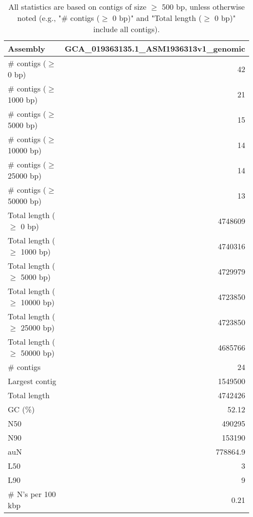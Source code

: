 \documentclass[12pt,a4paper]{article}
\begin{document}
\begin{table}[ht]
\begin{center}
\caption{All statistics are based on contigs of size $\geq$ 500 bp, unless otherwise noted (e.g., "\# contigs ($\geq$ 0 bp)" and "Total length ($\geq$ 0 bp)" include all contigs).}
\begin{tabular}{|l*{1}{|r}|}
\hline
Assembly & GCA\_019363135.1\_ASM1936313v1\_genomic \\ \hline
\# contigs ($\geq$ 0 bp) & 42 \\ \hline
\# contigs ($\geq$ 1000 bp) & 21 \\ \hline
\# contigs ($\geq$ 5000 bp) & 15 \\ \hline
\# contigs ($\geq$ 10000 bp) & 14 \\ \hline
\# contigs ($\geq$ 25000 bp) & 14 \\ \hline
\# contigs ($\geq$ 50000 bp) & 13 \\ \hline
Total length ($\geq$ 0 bp) & 4748609 \\ \hline
Total length ($\geq$ 1000 bp) & 4740316 \\ \hline
Total length ($\geq$ 5000 bp) & 4729979 \\ \hline
Total length ($\geq$ 10000 bp) & 4723850 \\ \hline
Total length ($\geq$ 25000 bp) & 4723850 \\ \hline
Total length ($\geq$ 50000 bp) & 4685766 \\ \hline
\# contigs & 24 \\ \hline
Largest contig & 1549500 \\ \hline
Total length & 4742426 \\ \hline
GC (\%) & 52.12 \\ \hline
N50 & 490295 \\ \hline
N90 & 153190 \\ \hline
auN & 778864.9 \\ \hline
L50 & 3 \\ \hline
L90 & 9 \\ \hline
\# N's per 100 kbp & 0.21 \\ \hline
\end{tabular}
\end{center}
\end{table}
\end{document}
